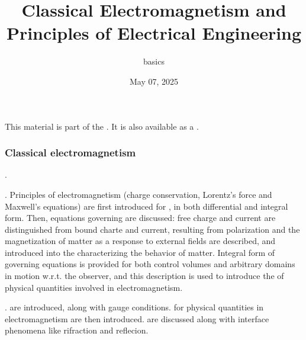 \documentclass[letterpaper,10pt,english]{jupyterBook}
\title{Classical Electromagnetism and Principles of Electrical Engineering}
\date{May 07, 2025}
\author{basics}
\begin{document}
\pagestyle{empty}
\sphinxmaketitle
\pagestyle{plain}
\sphinxtableofcontents
\pagestyle{normal}
\label{\detokenize{intro::doc}}


\sphinxAtStartPar
This material is part of the . It is also available as a .
\subsubsection*{Classical electromagnetism}

\sphinxAtStartPar
{\hyperref[\detokenize{ch/experiments:classical-electromagnetism-first-experiments}]{}}. 

\sphinxAtStartPar
{\hyperref[\detokenize{ch/principles:classical-electromagnetism-principles}]{}}. Principles of electromagnetism (charge conservation, Lorentz’s force and Maxwell’s equations) are first introduced for {\hyperref[\detokenize{ch/principles-vacuum:classical-electromagnetism-principles-free-space}]{}}, in both differential and integral form. Then, equations governing {\hyperref[\detokenize{ch/principles-matter:classical-electromagnetism-principles-matter}]{}} are discussed: free charge and current are distinguished from bound charte and current, resulting from polarization and the magnetization of matter as a response to external fields are described, and introduced into the  characterizing the behavior of matter. Integral form of governing equations is provided for both control volumes and arbitrary domains in motion w.r.t. the observer, and this description is used to introduce the {\hyperref[\detokenize{ch/principles-relativity:classical-electromagnetism-principles-low-speed-relativity}]{}} of physical quantities involved in electromagnetism.

\sphinxAtStartPar
{\hyperref[\detokenize{ch/waves:classical-electromagnetism-waves}]{}}. {\hyperref[\detokenize{ch/potentials:classical-electromagnetism-potentials}]{}} are introduced, along with gauge conditions. {\hyperref[\detokenize{ch/waves-equation:classical-electromagnetism-waves-wave-equation}]{}} for physical quantities in electromagnetism are then introduced. {\hyperref[\detokenize{ch/waves-plane:classical-electromagnetism-waves-plane-waves}]{}} are discussed along with interface phenomena like rifraction and reflecion.
\end{document}

